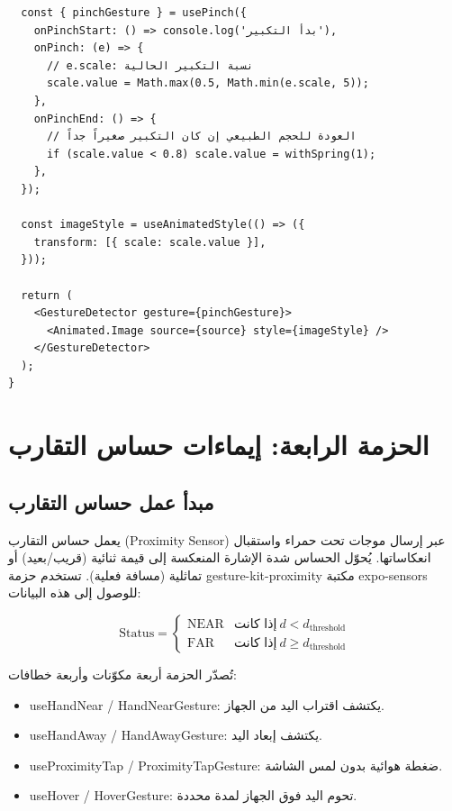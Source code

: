 \begin{Arabic}
\begin{english}
\begin{verbatim}
  const { pinchGesture } = usePinch({
    onPinchStart: () => console.log('بدأ التكبير'),
    onPinch: (e) => {
      // e.scale: نسبة التكبير الحالية
      scale.value = Math.max(0.5, Math.min(e.scale, 5));
    },
    onPinchEnd: () => {
      // العودة للحجم الطبيعي إن كان التكبير صغيراً جداً
      if (scale.value < 0.8) scale.value = withSpring(1);
    },
  });

  const imageStyle = useAnimatedStyle(() => ({
    transform: [{ scale: scale.value }],
  }));

  return (
    <GestureDetector gesture={pinchGesture}>
      <Animated.Image source={source} style={imageStyle} />
    </GestureDetector>
  );
}
\end{verbatim}
\end{english}

\section{الحزمة الرابعة: إيماءات حساس التقارب}

\subsection{مبدأ عمل حساس التقارب}

يعمل حساس التقارب (\textenglish{Proximity Sensor}) عبر إرسال موجات تحت حمراء واستقبال انعكاساتها. يُحوّل الحساس شدة الإشارة المنعكسة إلى قيمة ثنائية (قريب/بعيد) أو تماثلية (مسافة فعلية). تستخدم حزمة \textenglish{gesture-kit-proximity} مكتبة \textenglish{expo-sensors} للوصول إلى هذه البيانات:

\begin{equation}
\text{Status} = \begin{cases} \text{NEAR} & \text{إذا كانت} \ d < d_{\text{threshold}} \\ \text{FAR}  & \text{إذا كانت} \ d \geq d_{\text{threshold}} \end{cases}
\end{equation}

تُصدّر الحزمة أربعة مكوّنات وأربعة خطافات:
\begin{itemize}
    \item \textenglish{useHandNear} / \textenglish{HandNearGesture}: يكتشف اقتراب اليد من الجهاز.
    \item \textenglish{useHandAway} / \textenglish{HandAwayGesture}: يكتشف إبعاد اليد.
    \item \textenglish{useProximityTap} / \textenglish{ProximityTapGesture}: ضغطة هوائية بدون لمس الشاشة.
    \item \textenglish{useHover} / \textenglish{HoverGesture}: تحوم اليد فوق الجهاز لمدة محددة.
\end{itemize}


\end{Arabic}
